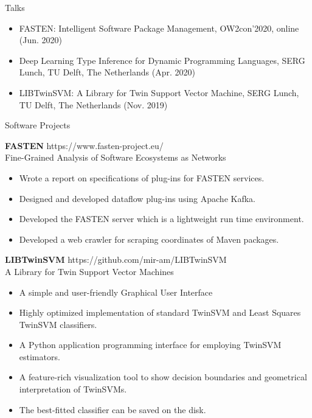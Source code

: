\documentclass{resume} %
\begin{document}
\begin{rSection}{Talks}
\begin{itemize}
	\item FASTEN: Intelligent Software Package Management, OW2con'2020, online (Jun. 2020)
	\item Deep Learning Type Inference for Dynamic Programming Languages, SERG Lunch, TU Delft, The Netherlands (Apr. 2020)
	\item LIBTwinSVM: A Library for Twin Support Vector Machine, SERG Lunch, TU Delft, The Netherlands (Nov. 2019)
\end{itemize}
\end{rSection}

\begin{rSection}{Software Projects}
	
	{\bf FASTEN} \hfill {https://www.fasten-project.eu/} \\ 
	Fine-Grained Analysis of Software Ecosystems as Networks \\
	
	
    \begin{itemize}
		\item Wrote a report on specifications of plug-ins for FASTEN services.
		\item Designed and developed dataflow plug-ins using Apache Kafka.
		\item Developed the FASTEN server which is a lightweight run time environment.
		\item Developed a web crawler for scraping coordinates of Maven packages.
	\end{itemize}
	
	{\bf LIBTwinSVM} \hfill {https://github.com/mir-am/LIBTwinSVM} \\ 
	A Library for Twin Support Vector Machines \\
	
	\begin{itemize}
		\item A simple and user-friendly Graphical User Interface
		\item Highly optimized implementation of standard TwinSVM and Least Squares TwinSVM classifiers.
		\item A Python application programming interface for employing TwinSVM estimators.
		\item A feature-rich visualization tool to show decision boundaries and geometrical interpretation of TwinSVMs.
		\item The best-fitted classifier can be saved on the disk.
	\end{itemize}
	

\end{rSection}
\end{document}
